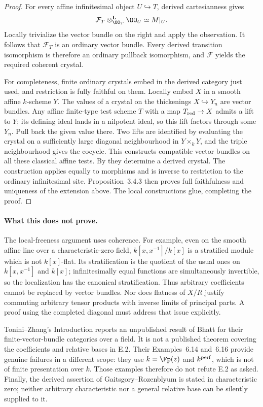 \begin{proof}
For every affine infinitesimal object $U\hookrightarrow T$, derived cartesianness gives
\[
             \mathcal F_T\otimes_{\OO_T}^{\mathbf L}\OO_U
                            \simeq M|_U .
\]
Locally trivialize the vector bundle on the right and apply the observation.  It follows that $\mathcal F_T$ is an ordinary vector bundle.  Every derived transition isomorphism is therefore an ordinary pullback isomorphism, and $\mathcal F$ yields the required coherent crystal.

For completeness, finite ordinary crystals embed in the derived category just used, and restriction is fully faithful on them.  Locally embed $X$ in a smooth affine $k$-scheme $Y$.  The values of a crystal on the thickenings $X\hookrightarrow Y_n$ are vector bundles.  Any affine finite-type test scheme $T$ with a map $T_{\rm red}\to X$ admits a lift to $Y$; its defining ideal lands in a nilpotent ideal, so this lift factors through some $Y_n$.  Pull back the given value there.  Two lifts are identified by evaluating the crystal on a sufficiently large diagonal neighbourhood in $Y\times_kY$, and the triple neighbourhood gives the cocycle.  This constructs compatible vector bundles on all these classical affine tests.  By \cite[Corollary~2.2.2]{GaitsgoryRozenblyum2014} they determine a derived crystal.  The construction applies equally to morphisms and is inverse to restriction to the ordinary infinitesimal site.  Proposition~3.4.3 then proves full faithfulness and uniqueness of the extension above.  The local constructions glue, completing the proof.
\end{proof}

\paragraph{What this does not prove.}
The local-freeness argument uses coherence.  For example, even on the smooth affine line over a characteristic-zero field, $k[x,x^{-1}]/k[x]$ is a stratified module which is not $k[x]$-flat.  Its stratification is the quotient of the usual ones on $k[x,x^{-1}]$ and $k[x]$; infinitesimally equal functions are simultaneously invertible, so the localization has the canonical stratification.  Thus arbitrary coefficients cannot be replaced by vector bundles.  Nor does flatness of $X/R$ justify commuting arbitrary tensor products with inverse limits of principal parts.  A proof using the completed diagonal must address that issue explicitly.

Tonini--Zhang's Introduction reports an unpublished result of Bhatt for their finite-vector-bundle categories over a field.  It is not a published theorem covering the coefficients and relative bases in E.2.  Their Examples~6.14 and~6.16 provide genuine failures in a different scope: they use $k=\Fp(z)$ and $k^{\rm perf}$, which is not of finite presentation over $k$.  Those examples therefore do not refute E.2 as asked.  Finally, the derived assertion of Gaitsgory--Rozenblyum is stated in characteristic zero; neither arbitrary characteristic nor a general relative base can be silently supplied to it.


